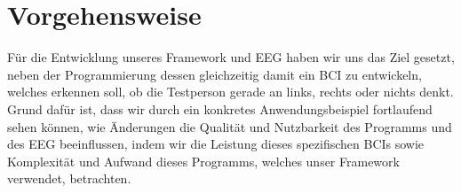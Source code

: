 \documentclass[10pt]{article}
\begin{document}
\begin{itemize}
\end{itemize}
 
\section{Vorgehensweise}

Für die Entwicklung unseres Framework und EEG haben wir uns das Ziel gesetzt, neben der Programmierung dessen gleichzeitig damit ein BCI zu entwickeln, welches erkennen soll, ob die Testperson gerade an links, rechts oder nichts denkt.
Grund dafür ist, dass wir durch ein konkretes Anwendungsbeispiel fortlaufend sehen können, wie Änderungen die Qualität und Nutzbarkeit des Programms und des EEG beeinflussen, indem wir die Leistung dieses spezifischen BCIs sowie Komplexität und Aufwand dieses Programms, welches unser Framework verwendet, betrachten.
\end{document}
